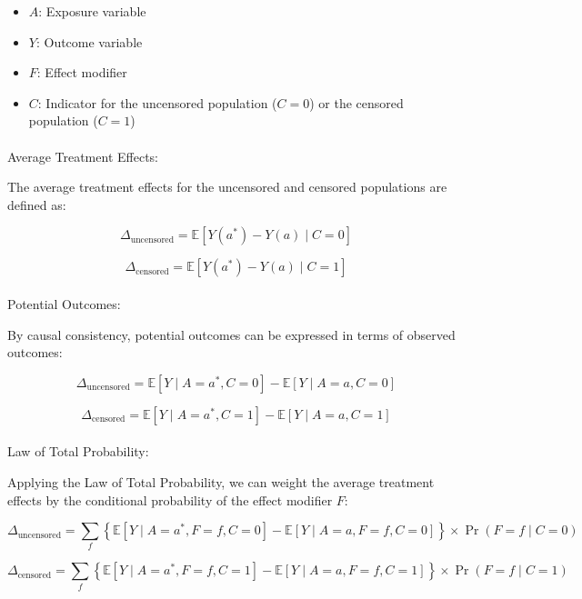 \documentclass[
  single column]{article}
\makeatletter
\let\oldparagraph\paragraph
\renewcommand{\paragraph}{
    \@ifstar
      \xxxParagraphStar
      \xxxParagraphNoStar
  }
\newcommand{\xxxParagraphStar}[1]{\oldparagraph*{#1}\mbox{}}
\newcommand{\xxxParagraphNoStar}[1]{\oldparagraph{#1}\mbox{}}
\providecommand{\tightlist}{%
  \setlength{\itemsep}{0pt}\setlength{\parskip}{0pt}}\usepackage{longtable,booktabs,array}
\makeatother
\begin{document}
\begin{itemize}
\tightlist
\item
  \textbf{\(A\)}: Exposure variable
\item
  \textbf{\(Y\)}: Outcome variable
\item
  \textbf{\(F\)}: Effect modifier
\item
  \textbf{\(C\)}: Indicator for the uncensored population (\(C = 0\)) or
  the censored population (\(C = 1\))
\end{itemize}

\paragraph{Average Treatment Effects:}\label{average-treatment-effects}

The average treatment effects for the uncensored and censored
populations are defined as:

\[
\Delta_{\text{uncensored}} = \mathbb{E}[Y(a^*) - Y(a) \mid C = 0]
\]

\[
\Delta_{\text{censored}} = \mathbb{E}[Y(a^*) - Y(a) \mid C = 1]
\]

\paragraph{Potential Outcomes:}\label{potential-outcomes}

By causal consistency, potential outcomes can be expressed in terms of
observed outcomes:

\[
\Delta_{\text{uncensored}} = \mathbb{E}[Y \mid A=a^*, C=0] - \mathbb{E}[Y \mid A=a, C=0]
\]

\[
\Delta_{\text{censored}} = \mathbb{E}[Y \mid A=a^*, C=1] - \mathbb{E}[Y \mid A=a, C=1]
\]

\paragraph{Law of Total Probability:}\label{law-of-total-probability}

Applying the Law of Total Probability, we can weight the average
treatment effects by the conditional probability of the effect modifier
\(F\):

\[
\Delta_{\text{uncensored}} = \sum_{f} \left\{\mathbb{E}[Y \mid A=a^*, F=f, C=0] - \mathbb{E}[Y \mid A=a, F=f, C=0]\right\} \times \Pr(F=f \mid C=0)
\]

\[
\Delta_{\text{censored}} = \sum_{f} \left\{\mathbb{E}[Y \mid A=a^*, F=f, C=1] - \mathbb{E}[Y \mid A=a, F=f, C=1]\right\} \times \Pr(F=f \mid C=1)
\]
\end{document}
